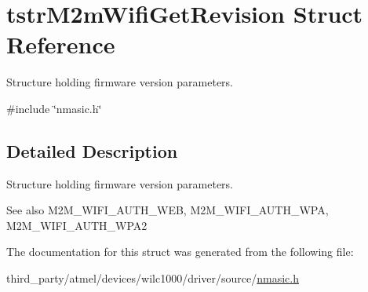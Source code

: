 \hypertarget{structtstrM2mWifiGetRevision}{}\section{tstr\+M2m\+Wifi\+Get\+Revision Struct Reference}
\label{structtstrM2mWifiGetRevision}


Structure holding firmware version parameters.  




{\ttfamily \#include \char`\"{}nmasic.\+h\char`\"{}}



\subsection{Detailed Description}
Structure holding firmware version parameters. 

\begin{DoxySeeAlso}{See also}
M2\+M\+\_\+\+W\+I\+F\+I\+\_\+\+A\+U\+T\+H\+\_\+\+W\+EB, M2\+M\+\_\+\+W\+I\+F\+I\+\_\+\+A\+U\+T\+H\+\_\+\+W\+PA, M2\+M\+\_\+\+W\+I\+F\+I\+\_\+\+A\+U\+T\+H\+\_\+\+W\+P\+A2 
\end{DoxySeeAlso}


The documentation for this struct was generated from the following file\+:\begin{DoxyCompactItemize}
\item 
third\+\_\+party/atmel/devices/wilc1000/driver/source/\hyperlink{nmasic_8h}{nmasic.\+h}\end{DoxyCompactItemize}
